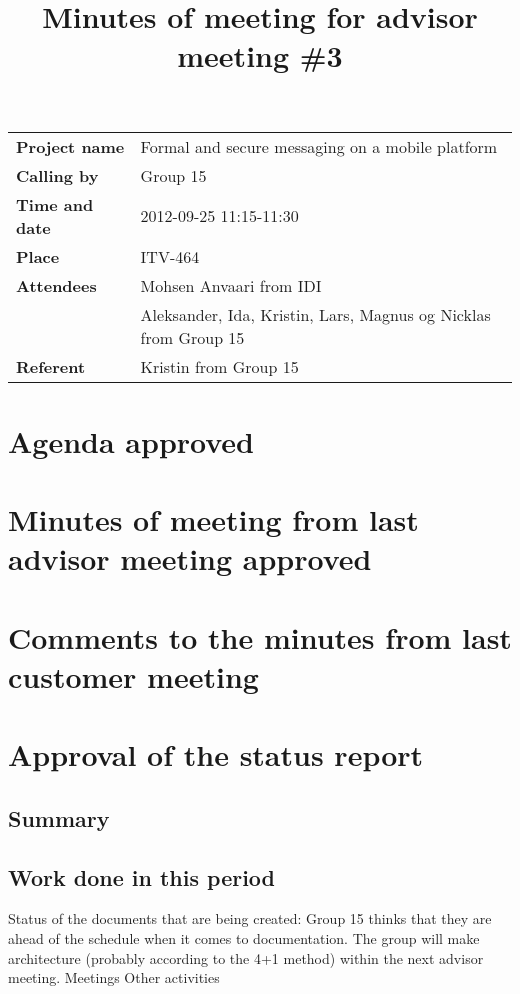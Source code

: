 \documentclass[a4paper,12pt]{article}
\begin{document}
\title{Minutes of meeting for advisor meeting \#3}
\maketitle
\begin{tabular}{>{\bfseries}l l}	
Project name&Formal and secure messaging on a mobile platform\\
Calling by&Group 15\\
Time and date&2012-09-25 11:15-11:30\\
Place&ITV-464\\
Attendees&Mohsen Anvaari from IDI\\
 & Aleksander, Ida, Kristin, Lars, Magnus og Nicklas from Group 15\\
Referent&Kristin from Group 15\\
\end{tabular}
\section{Agenda approved}
\section{Minutes of meeting from last advisor meeting approved}
\section{Comments to the minutes from last customer meeting}
\section{Approval of the status report}
\subsection{Summary}
\subsection{Work done in this period}
Status of the documents that are being created:
\newline
Group 15 thinks that they are ahead of the schedule when it comes to documentation.
The group will make architecture (probably according to the 4+1 method) within the next 
advisor meeting.
\newline
\newline
Meetings
\newline
\newline
Other activities
\end{document}
